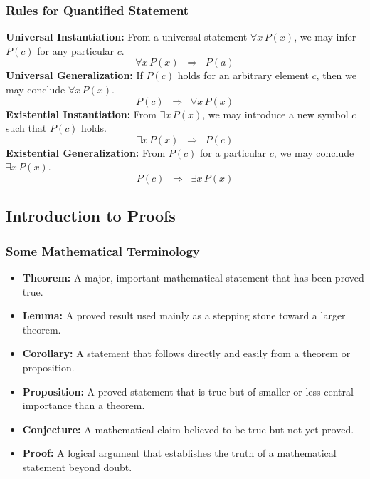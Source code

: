 \documentclass[11pt]{article}
\begin{document}
\subsubsection*{Rules for Quantified Statement}
\textbf{Universal Instantiation:} From a universal statement $\forall x\, P(x)$, we may infer $P(c)$ for any particular $c$.  
\[
    \forall x\, P(x) \;\;\Rightarrow\;\; P(a)
\]
\textbf{Universal Generalization:} If $P(c)$ holds for an arbitrary element $c$, then we may conclude $\forall x\, P(x)$.  
\[
    P(c) \;\;\Rightarrow\;\; \forall x\, P(x)
\]
\textbf{Existential Instantiation:} From $\exists x\, P(x)$, we may introduce a new symbol $c$ such that $P(c)$ holds.  
\[
    \exists x\, P(x) \;\;\Rightarrow\;\; P(c)
\]
\textbf{Existential Generalization:}   From $P(c)$ for a particular $c$, we may conclude $\exists x\, P(x)$.  
\[
    P(c) \;\;\Rightarrow\;\; \exists x\, P(x)
\]
\subsection{Introduction to Proofs}
\subsubsection{Some Mathematical Terminology}
\begin{itemize}
    \item \textbf{Theorem:} A major, important mathematical statement that has been proved true.
    \item \textbf{Lemma:} A proved result used mainly as a stepping stone toward a larger theorem.
    \item \textbf{Corollary:} A statement that follows directly and easily from a theorem or proposition.
    \item \textbf{Proposition:} A proved statement that is true but of smaller or less central importance than a theorem.
    \item \textbf{Conjecture:} A mathematical claim believed to be true but not yet proved.
    \item \textbf{Proof:} A logical argument that establishes the truth of a mathematical statement beyond doubt.
\end{itemize}
\end{document}
